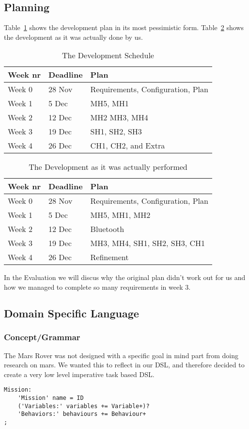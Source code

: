 \documentclass{scrartcl}
\begin{document}
\subsection{Planning}
Table~\ref{tab:plan} shows the development plan in its most pessimistic form.
Table~\ref{tab:dev} shows the development as it was actually done by us.
\begin{table}
	\centering
	\begin{tabular}{|l|l|l|}
		\hline
		Week nr & Deadline & Plan \\\hline
		Week 0 & 28 Nov & Requirements, Configuration, Plan \\\hline
		Week 1 & 5 Dec & MH5, MH1 \\\hline
		Week 2 & 12 Dec & MH2 MH3, MH4 \\\hline
		Week 3 & 19 Dec & SH1, SH2, SH3 \\\hline
		Week 4 & 26 Dec & CH1, CH2, and Extra \\\hline
	\end{tabular}
	\caption{The Development Schedule}
	\label{tab:plan}
\end{table}
\begin{table}
	\centering
	\begin{tabular}{|l|l|l|}
		\hline
		Week nr & Deadline & Plan \\\hline
		Week 0 & 28 Nov & Requirements, Configuration, Plan \\\hline
		Week 1 & 5 Dec & MH5, MH1, MH2\\\hline
		Week 2 & 12 Dec & Bluetooth \\\hline
		Week 3 & 19 Dec & MH3, MH4, SH1, SH2, SH3, CH1 \\\hline
		Week 4 & 26 Dec & Refinement \\\hline
	\end{tabular}
	\caption{The Development as it was actually performed}
	\label{tab:dev}
\end{table}

In the Evaluation we will discus why the original plan didn't work out for us and how we managed to complete so many requirements in week 3.

\subsection{Domain Specific Language}
\subsubsection{Concept/Grammar}
The Mars Rover was not designed with a specific goal in mind part from doing research on mars.
We wanted this to reflect in our DSL, and therefore decided to create a very low level imperative task based DSL.
\begin{verbatim}
Mission:
	'Mission' name = ID
	('Variables:' variables += Variable+)?
	'Behaviors:' behaviours += Behaviour+
;
\end{verbatim}
\end{document}
